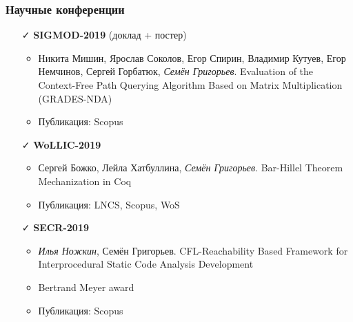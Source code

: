 \documentclass[xcolor=table]{beamer}
\begin{document}
\begin{frame}[fragile]
\frametitle{Научные конференции}
\begin{itemize}

      \item[\faCheck] \textbf{SIGMOD-2019} (доклад + постер)
      \begin{itemize}
        \item Никита Мишин, Ярослав Соколов, Егор Спирин, Владимир Кутуев, Егор Немчинов, Сергей Горбатюк, \emph{Семён Григорьев}. Evaluation of the Context-Free Path Querying Algorithm Based on Matrix Multiplication (GRADES-NDA)
        \item Публикация: Scopus
      \end{itemize}

      \item[\faCheck] \textbf{WoLLIC-2019}
      \begin{itemize}
        \item Сергей Божко, Лейла Хатбуллина, \emph{Семён Григорьев}. Bar-Hillel Theorem Mechanization in Coq
        \item Публикация: LNCS, Scopus, WoS
      \end{itemize}

      \item[\faCheck] \textbf{SECR-2019}
      \begin{itemize}
         \item \emph{Илья Ножкин}, Семён Григорьев. CFL-Reachability Based Framework for Interprocedural Static Code Analysis Development
         \item Bertrand Meyer award
         \item Публикация: Scopus
      \end{itemize}

    \end{itemize}
    \end{frame}
\end{document}
